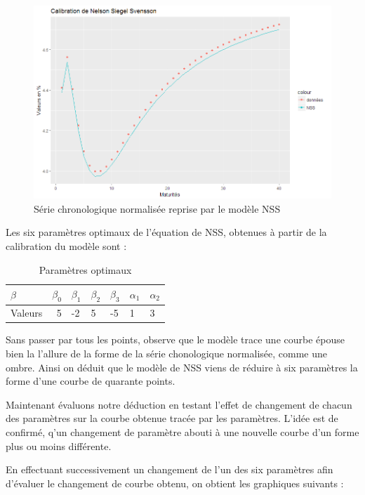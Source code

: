 \begin{figure}[H]
\centering
\caption{Série chronologique normalisée reprise par le modèle NSS}
   \includegraphics[scale=0.7]{img/nss.png}
\end{figure}

Les six paramètres optimaux de l'équation de NSS, obtenues à partir de la calibration du modèle sont : 

\begin{table}[H]
\centering
\caption{Paramètres optimaux}
\label{my-label}
\begin{tabular}{|l|r|l|l|l|l|l|}
\hline
$\beta$ & $\beta_0$ & $\beta_1 $ & $\beta_2$ & $\beta_3$ & $\alpha_1$ & $\alpha_2$ \\ \hline
Valeurs & 5 & -2 & 5 & -5 & 1 & 3 \\ \hline
\end{tabular}
\end{table}

Sans passer par tous les points, observe que le modèle trace une courbe épouse bien la l'allure de la forme de la série chonologique normalisée, comme une ombre. Ainsi on déduit que le modèle de NSS viens de réduire à six paramètres la forme d'une courbe de quarante points.

Maintenant évaluons notre déduction en testant l'effet de changement de chacun des paramètres sur la courbe obtenue tracée par les paramètres. L'idée est de confirmé, q'un changement de paramètre abouti à une nouvelle courbe d'un forme plus ou moins différente.

En effectuant successivement un changement de l'un des six paramètres afin d'évaluer le changement de courbe obtenu, on obtient les graphiques suivants :

